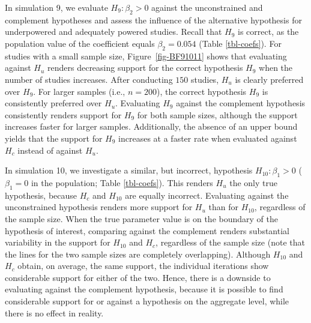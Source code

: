 \documentclass[
]{interact}
\begin{document}
In simulation 9, we evaluate \(H_9: \beta_2 > 0\) against the
unconstrained and complement hypotheses and assess the influence of the
alternative hypothesis for underpowered and adequately powered studies.
Recall that \(H_9\) is correct, as the population value of the
coefficient equals \(\beta_2 = 0.054\) (Table \ref{tbl-coefs}). For
studies with a small sample size, Figure~\ref{fig-BF91011} shows that
evaluating against \(H_u\) renders decreasing support for the correct
hypothesis \(H_9\) when the number of studies increases. After
conducting \(150\) studies, \(H_u\) is clearly preferred over \(H_9\).
For larger samples (i.e., \(n = 200\)), the correct hypothesis \(H_9\)
is consistently preferred over \(H_u\). Evaluating \(H_9\) against the
complement hypothesis consistently renders support for \(H_9\) for both
sample sizes, although the support increases faster for larger samples.
Additionally, the absence of an upper bound yields that the support for
\(H_9\) increases at a faster rate when evaluated against \(H_c\)
instead of against \(H_u\).

In simulation 10, we investigate a similar, but incorrect, hypothesis
\(H_{10}: \beta_1 > 0\) (\(\beta_{1}=0\) in the population; Table
\ref{tbl-coefs}). This renders \(H_u\) the only true hypothesis, because
\(H_c\) and \(H_{10}\) are equally incorrect. Evaluating against the
unconstrained hypothesis renders more support for \(H_u\) than for
\(H_{10}\), regardless of the sample size. When the true parameter value
is on the boundary of the hypothesis of interest, comparing against the
complement renders substantial variability in the support for \(H_{10}\)
and \(H_c\), regardless of the sample size (note that the lines for the
two sample sizes are completely overlapping). Although \(H_{10}\) and
\(H_c\) obtain, on average, the same support, the individual iterations
show considerable support for either of the two. Hence, there is a
downside to evaluating against the complement hypothesis, because it is
possible to find considerable support for or against a hypothesis on the
aggregate level, while there is no effect in reality.
\end{document}
